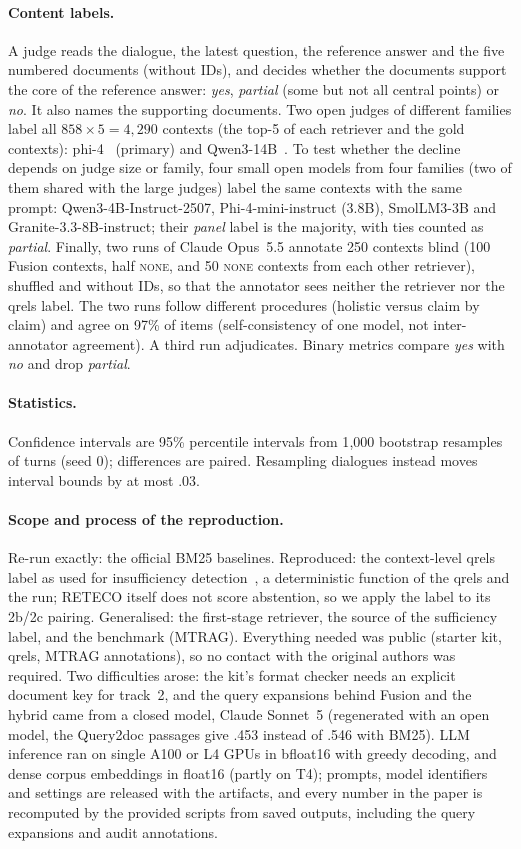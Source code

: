 \documentclass[11pt]{article}
\newcommand{\qnone}{\textnormal{\textsc{none}}}
\newcommand{\cno}{\textit{no}}
\newcommand{\cyes}{\textit{yes}}
\newcommand{\cpart}{\textit{partial}}
\begin{document}
\paragraph{Content labels.}
A judge reads the dialogue, the latest question, the reference answer and the five numbered documents (without IDs), and decides whether the documents support the core of the reference answer: \cyes, \cpart{} (some but not all central points) or \cno. It also names the supporting documents. Two open judges of different families label all $858\times5=4{,}290$ contexts (the top-5 of each retriever and the gold contexts): phi-4~\cite{abdin2024phi4} (primary) and Qwen3-14B~\cite{yang2025qwen3}. To test whether the decline depends on judge size or family, four small open models from four families (two of them shared with the large judges) label the same contexts with the same prompt: Qwen3-4B-Instruct-2507, Phi-4-mini-instruct (3.8B), SmolLM3-3B and Granite-3.3-8B-instruct; their \emph{panel} label is the majority, with ties counted as \cpart. Finally, two runs of Claude Opus~5.5 annotate 250 contexts blind (100 Fusion contexts, half \qnone, and 50 \qnone{} contexts from each other retriever), shuffled and without IDs, so that the annotator sees neither the retriever nor the qrels label. The two runs follow different procedures (holistic versus claim by claim) and agree on 97\% of items (self-consistency of one model, not inter-annotator agreement). A third run adjudicates. Binary metrics compare \cyes{} with \cno{} and drop \cpart.

\paragraph{Statistics.}
Confidence intervals are 95\% percentile intervals from 1{,}000 bootstrap resamples of turns (seed 0); differences are paired. Resampling dialogues instead moves interval bounds by at most .03.

\paragraph{Scope and process of the reproduction.}
Re-run exactly: the official BM25 baselines. Reproduced: the context-level qrels label as used for insufficiency detection~\cite{chen2026rinse}, a deterministic function of the qrels and the run; RETECO itself does not score abstention, so we apply the label to its 2b/2c pairing. Generalised: the first-stage retriever, the source of the sufficiency label, and the benchmark (MTRAG). Everything needed was public (starter kit, qrels, MTRAG annotations), so no contact with the original authors was required. Two difficulties arose: the kit's format checker needs an explicit document key for track~2, and the query expansions behind Fusion and the hybrid came from a closed model, Claude Sonnet~5 (regenerated with an open model, the Query2doc passages give .453 instead of .546 with BM25). LLM inference ran on single A100 or L4 GPUs in bfloat16 with greedy decoding, and dense corpus embeddings in float16 (partly on T4); prompts, model identifiers and settings are released with the artifacts, and every number in the paper is recomputed by the provided scripts from saved outputs, including the query expansions and audit annotations.
\end{document}
